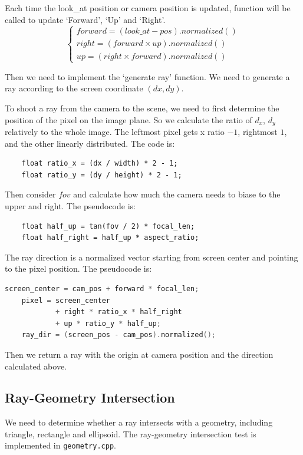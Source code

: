 \documentclass[acmtog]{acmart}
\begin{document}
Each time the look\_at position or camera position is updated, function {\color{magenta}{Camera::lookAt}} will be called to update `Forward', `Up' and `Right'. \[\begin{cases}
	forward = (look\_at - pos).normalized() \\
	right = (forward \times up).normalized() \\
	up = (right \times forward).normalized()
\end{cases}\]

Then we need to implement the `generate ray' function. We need to generate a ray according to the screen coordinate $(dx, dy)$.

To shoot a ray from the camera to the scene, we need to first determine the position of the pixel on the image plane.
So we calculate the ratio of $d_x$, $d_y$ relatively to the whole image. The leftmost pixel gets x ratio $-1$, rightmost $1$, and the other linearly distributed. The code is:

\begin{lstlisting}
	float ratio_x = (dx / width) * 2 - 1;
	float ratio_y = (dy / height) * 2 - 1;
\end{lstlisting}

Then consider $fov$ and calculate how much the camera needs to biase to the upper and right. The pseudocode is:

\begin{lstlisting}
	float half_up = tan(fov / 2) * focal_len;
	float half_right = half_up * aspect_ratio;
\end{lstlisting}

The ray direction is a normalized vector starting from screen center and pointing to the pixel position. The pseudocode is:

\begin{lstlisting}[language=C++]
	screen_center = cam_pos + forward * focal_len;
	pixel = screen_center
	        + right * ratio_x * half_right
	        + up * ratio_y * half_up;
	ray_dir = (screen_pos - cam_pos).normalized();
\end{lstlisting}

Then we return a ray with the origin at camera position and the direction calculated above.


\subsection{Ray-Geometry Intersection}

We need to determine whether a ray intersects with a geometry, including triangle, rectangle and ellipsoid. The ray-geometry intersection test is implemented in \verb|geometry.cpp|.
\end{document}
